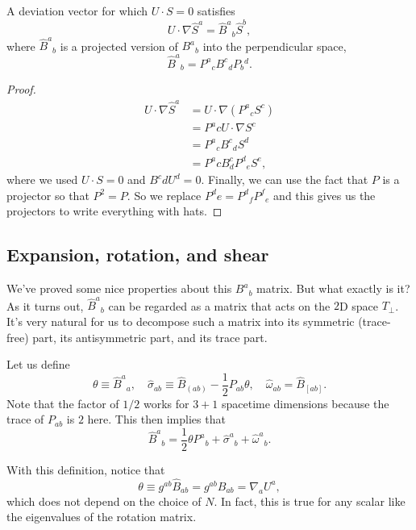 \begin{prop}
    A deviation vector for which $U\cdot S=0$ satisfies
    \begin{equation}
        U\cdot \nabla \hat S^a = \hat B^a{}_b \hat S^b,
    \end{equation}
    where $\hat B^a{}_b$ is a projected version of $B^a{}_b$ into the perpendicular space,
    \begin{equation}
        \hat B^a{}_b=P^a{}_c B^c{}_d P_b{}^d.
    \end{equation}
\end{prop}
\begin{proof}
    \begin{align*}
        U\cdot \nabla \hat S^a &= U\cdot \nabla(P^a{}_c S^c)\\
            &= P^a{}c U\cdot \nabla S^c\\
            &= P^a{}_c B^c{}_d S^d\\
            &= P^a{}c B^c_d P^d{}_e S^e,
    \end{align*}
    where we used $U\cdot S=0$ and $B^c{}d U^d=0$. Finally, we can use the fact that $P$ is a projector so that $P^2=P$. So we replace $P^d{}e=P^d{}_f P^f{}_e$ and this gives us the projectors to write everything with hats.
\end{proof}

\subsection*{Expansion, rotation, and shear}
We've proved some nice properties about this $B^a{}_b$ matrix. But what exactly is it? As it turns out, $\hat B^a{}_b$ can be regarded as a matrix that acts on the $2$D space $T_\perp$. It's very natural for us to decompose such a matrix into its symmetric (trace-free) part, its antisymmetric part, and its trace part.
\begin{defn}
    Let us define
    \begin{equation}
        \theta \equiv \hat B^a{}_a, \quad \hat \sigma_{ab} \equiv \hat B_{(ab)}-\frac{1}{2} P_{ab} \theta, \quad \hat \omega_{ab} = \hat B_{[ab]}.
    \end{equation}
    Note that the factor of $1/2$ works for $3+1$ spacetime dimensions because the trace of $P_{ab}$ is $2$ here. This then implies that
    \begin{equation}
        \hat B^a{}_b = \frac{1}{2} \theta P^a{}_b +\hat \sigma^a{}_b +\hat \omega^a{}_b.
    \end{equation}
\end{defn}
With this definition, notice that
\begin{equation}
    \theta \equiv g^{ab} \hat B_{ab} = g^{ab} B_{ab} =\nabla_a U^a,
\end{equation}
which does not depend on the choice of $N$. In fact, this is true for any scalar like the eigenvalues of the rotation matrix.

